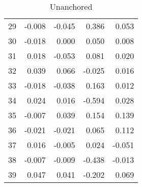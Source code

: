 \begin{table}[ht]
\begin{tabular}{rrrrr}
  29 & -0.008 & -0.045 & 0.386 & 0.053 \\ 
  30 & -0.018 & 0.000 & 0.050 & 0.008 \\ 
  31 & 0.018 & -0.053 & 0.081 & 0.020 \\ 
  32 & 0.039 & 0.066 & -0.025 & 0.016 \\ 
  33 & -0.018 & -0.038 & 0.163 & 0.012 \\ 
  34 & 0.024 & 0.016 & -0.594 & 0.028 \\ 
  35 & -0.007 & 0.039 & 0.154 & 0.139 \\ 
  36 & -0.021 & -0.021 & 0.065 & 0.112 \\ 
  37 & 0.016 & -0.005 & 0.024 & -0.051 \\ 
  38 & -0.007 & -0.009 & -0.438 & -0.013 \\ 
  39 & 0.047 & 0.041 & -0.202 & 0.069 \\ 
   \hline
\end{tabular}
\caption{Unanchored} 
\label{table:xi}
\end{table}
